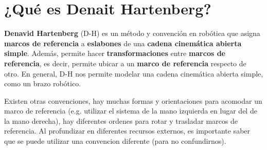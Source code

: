 \section{¿Qué es Denait Hartenberg?}
\textbf{Denavid Hartenberg} (D-H) es un método y convención en robótica que asigna \textbf{marcos de referencia} a \textbf{eslabones} de una \textbf{cadena cinemática abierta simple}. Además, permite hacer \textbf{transformaciones} entre \textbf{marcos de referencia}, es decir, permite ubicar a un \textbf{marco de referencia} respecto de otro. En general, D-H nos permite modelar una cadena cinemática abierta simple, como un brazo robótico.

Existen otras convenciones, hay muchas formas y orientaciones para acomodar un marco de referencia (e.g. utilizar el sistema de la mano izquierda en lugar del de la mano derecha), hay diferentes ordenes para rotar y trasladar marcos de referencia. Al profundizar en diferentes recursos externos, es importante saber que se puede utilizar una convencion diferente (para no confundirnos).